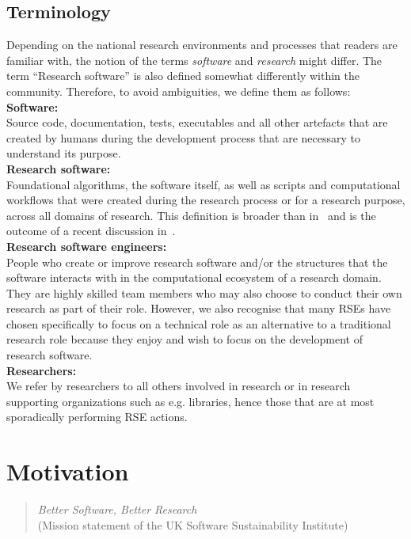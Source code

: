 \documentclass[a4paper]{article}
\makeatletter
\newcommand*{\eg}{e.g.\@\xspace}
\makeatother
\begin{document}
\subsection{Terminology}
Depending on the national research
environments and processes that readers are familiar with, the notion of the terms \emph{software} and \emph{research} might differ.
The term “Research software” is also defined somewhat differently within the community.
Therefore, to avoid ambiguities, we define them as follows:\\
\textbf{Software:}\\
Source code, documentation, tests, executables
and all other artefacts that are created by humans during the development process
that are necessary to understand its purpose.\\
\textbf{Research software:}\\
Foundational algorithms, the software itself,
as well as scripts and computational workflows that were created
during the research process or for a research purpose, across all domains of research.
This definition is broader than in~\autocite{FAIR4RS} and is the outcome of a recent
discussion in~\autocite{Gruenpeter2021}.\\
\textbf{Research software engineers:}\\
People who
create or improve research software and/or the structures that the software interacts with
in the computational ecosystem of a research domain.
They are highly skilled team members who may also choose to conduct their own research as
part of their role.
However, we also recognise that many RSEs have chosen specifically to focus on a technical
role as an alternative to a traditional research role because they enjoy and wish to focus
on the development of research software.\\
\textbf{Researchers:}\\
We refer by researchers to all others involved in research or in research supporting organizations such as \eg libraries,
hence those that are at most sporadically performing RSE actions.

\section{Motivation}


\begin{quotation}
      \textit{Better Software, Better Research}\\(Mission statement of the UK Software Sustainability Institute)
\end{quotation}
\end{document}
